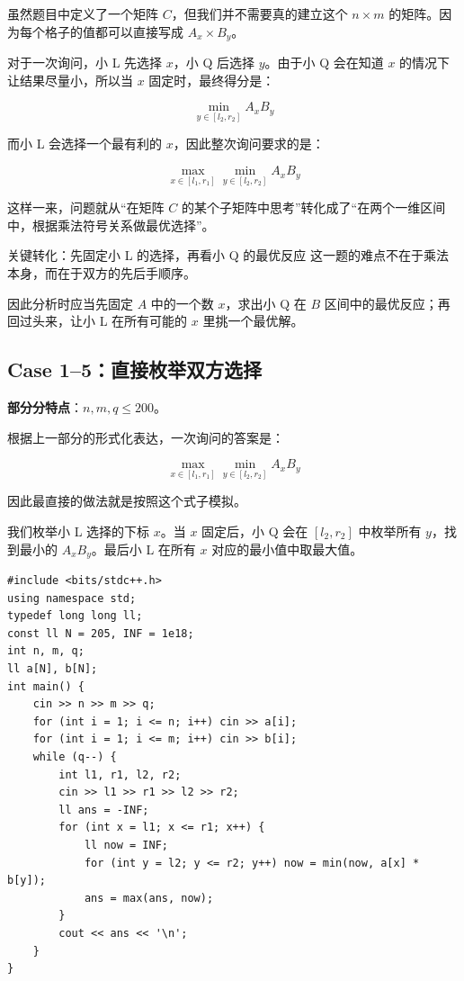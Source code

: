 \documentclass{book}
\begin{document}
虽然题目中定义了一个矩阵 $C$，但我们并不需要真的建立这个 $n\times m$ 的矩阵。因为每个格子的值都可以直接写成 $A_x\times B_y$。

对于一次询问，小 L 先选择 $x$，小 Q 后选择 $y$。由于小 Q 会在知道 $x$ 的情况下让结果尽量小，所以当 $x$ 固定时，最终得分是：

$$
\min_{y\in [l_2,r_2]} A_xB_y
$$

而小 L 会选择一个最有利的 $x$，因此整次询问要求的是：

$$
\max_{x\in [l_1,r_1]}\min_{y\in [l_2,r_2]} A_xB_y
$$

这样一来，问题就从“在矩阵 $C$ 的某个子矩阵中思考”转化成了“在两个一维区间中，根据乘法符号关系做最优选择”。

\begin{keybox}{关键转化：先固定小 L 的选择，再看小 Q 的最优反应}
这一题的难点不在于乘法本身，而在于双方的先后手顺序。

因此分析时应当先固定 $A$ 中的一个数 $x$，求出小 Q 在 $B$ 区间中的最优反应；再回过头来，让小 L 在所有可能的 $x$ 里挑一个最优解。
\end{keybox}

\newpage
\subsection{Case 1--5：直接枚举双方选择}

\textbf{部分分特点}：$n,m,q\le 200$。

根据上一部分的形式化表达，一次询问的答案是：

$$
\max_{x\in [l_1,r_1]}\min_{y\in [l_2,r_2]} A_xB_y
$$

因此最直接的做法就是按照这个式子模拟。

我们枚举小 L 选择的下标 $x$。当 $x$ 固定后，小 Q 会在 $[l_2,r_2]$ 中枚举所有 $y$，找到最小的 $A_xB_y$。最后小 L 在所有 $x$ 对应的最小值中取最大值。
\begin{lstlisting}[style = code]
#include <bits/stdc++.h>
using namespace std;
typedef long long ll;
const ll N = 205, INF = 1e18;
int n, m, q;
ll a[N], b[N];
int main() {
    cin >> n >> m >> q;
    for (int i = 1; i <= n; i++) cin >> a[i];
    for (int i = 1; i <= m; i++) cin >> b[i];
    while (q--) {
        int l1, r1, l2, r2;
        cin >> l1 >> r1 >> l2 >> r2;
        ll ans = -INF;
        for (int x = l1; x <= r1; x++) {
            ll now = INF;
            for (int y = l2; y <= r2; y++) now = min(now, a[x] * b[y]);
            ans = max(ans, now);
        }
        cout << ans << '\n';
    }
}

\end{lstlisting}
\end{document}
